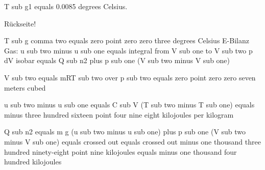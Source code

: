 T sub g1 equals 0.0085 degrees Celsius. 

Rückseite!

T sub g comma two equals zero point zero zero three degrees Celsius  
E-Bilanz Gas:  
u sub two minus u sub one equals integral from V sub one to V sub two p dV isobar equals Q sub n2 plus p sub one (V sub two minus V sub one)  

V sub two equals mRT sub two over p sub two equals zero point zero zero seven meters cubed  

u sub two minus u sub one equals C sub V (T sub two minus T sub one) equals minus three hundred sixteen point four nine eight kilojoules per kilogram  

Q sub n2 equals m g (u sub two minus u sub one) plus p sub one (V sub two minus V sub one) equals crossed out equals crossed out minus one thousand three hundred ninety-eight point nine kilojoules equals minus one thousand four hundred kilojoules